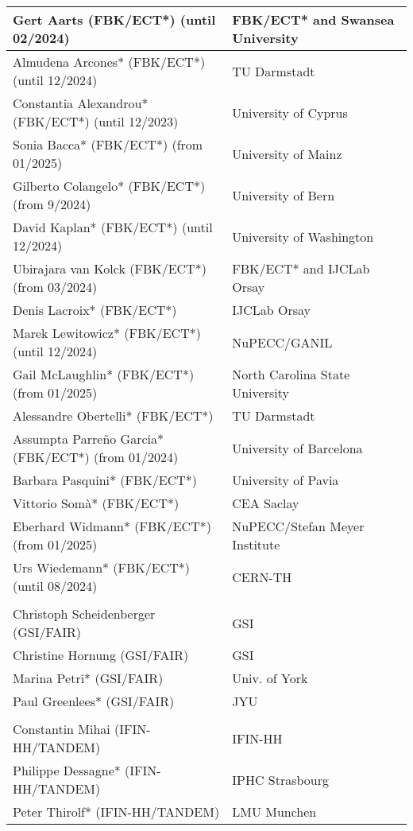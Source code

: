 \begin{longtable}{|L{0.48\textwidth}|C{0.48\textwidth}|}
Gert Aarts (FBK/ECT*)  (until 02/2024)  & FBK/ECT* and Swansea University \\ \hline
Almudena Arcones* (FBK/ECT*)  (until 12/2024) &  TU Darmstadt \\ \hline
Constantia Alexandrou* (FBK/ECT*)  (until 12/2023) & University of Cyprus \\ \hline
Sonia Bacca* (FBK/ECT*)  (from 01/2025) &  University of Mainz \\ \hline
Gilberto Colangelo* (FBK/ECT*) (from 9/2024) & University of Bern\\ \hline
David Kaplan* (FBK/ECT*)  (until 12/2024) & University of Washington \\ \hline
Ubirajara van Kolck (FBK/ECT*)  (from 03/2024)  & FBK/ECT* and IJCLab Orsay \\ \hline   
Denis Lacroix* (FBK/ECT*)  & IJCLab Orsay \\ \hline
Marek Lewitowicz* (FBK/ECT*)  (until 12/2024)  & NuPECC/GANIL \\ \hline
Gail McLaughlin* (FBK/ECT*)  (from 01/2025) & North Carolina State University \\ \hline
Alessandre Obertelli* (FBK/ECT*)    & TU Darmstadt \\ \hline
Assumpta Parre\~no Garcia* (FBK/ECT*) (from 01/2024) & University of Barcelona \\ \hline
Barbara Pasquini* (FBK/ECT*)    & University of Pavia \\ \hline
Vittorio Somà* (FBK/ECT*)    & CEA Saclay \\ \hline
Eberhard Widmann* (FBK/ECT*) (from 01/2025) & NuPECC/Stefan Meyer Institute\\ \hline
Urs Wiedemann* (FBK/ECT*)  (until 08/2024) & CERN-TH \\ \hline

      \\ \hline
    Christoph Scheidenberger (GSI/FAIR)	& GSI \\ \hline
    Christine Hornung (GSI/FAIR)	& GSI \\ \hline
    Marina Petri* (GSI/FAIR)	& Univ. of York \\ \hline
    Paul Greenlees* (GSI/FAIR)	& JYU \\ \hline

      \\ \hline
    Constantin Mihai (IFIN-HH/TANDEM)	& IFIN-HH \\ \hline
    Philippe Dessagne*  (IFIN-HH/TANDEM)	& IPHC Strasbourg \\ \hline
    Peter Thirolf*  (IFIN-HH/TANDEM)	& LMU Munchen \\ \hline


\end{longtable}
